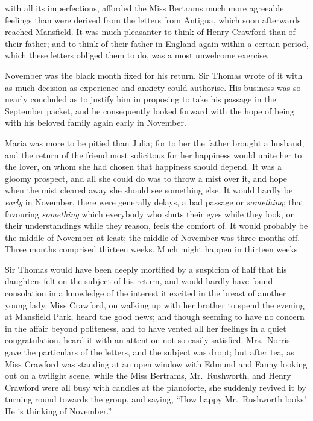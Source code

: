  with all its imperfections,
afforded the Miss Bertrams much more agreeable feelings
than were derived from the letters from Antigua,
which soon afterwards reached Mansfield.  It was much
pleasanter to think of Henry Crawford than of their father;
and to think of their father in England again within
a certain period, which these letters obliged them to do,
was a most unwelcome exercise.

November was the black month fixed for his return.
Sir Thomas wrote of it with as much decision as experience
and anxiety could authorise.  His business was so nearly
concluded as to justify him in proposing to take his
passage in the September packet, and he consequently
looked forward with the hope of being with his beloved
family again early in November.

Maria was more to be pitied than Julia; for to her the
father brought a husband, and the return of the friend most
solicitous for her happiness would unite her to the lover,
on whom she had chosen that happiness should depend.
It was a gloomy prospect, and all she could do was to
throw a mist over it, and hope when the mist cleared
away she should see something else.  It would hardly
be \emph{early} in November, there were generally delays,
a bad passage or \emph{something}; that favouring \emph{something}
which everybody who shuts their eyes while they look,
or their understandings while they reason, feels the
comfort of.  It would probably be the middle of November
at least; the middle of November was three months off.
Three months comprised thirteen weeks.  Much might happen
in thirteen weeks.

Sir Thomas would have been deeply mortified by a suspicion
of half that his daughters felt on the subject of his return,
and would hardly have found consolation in a knowledge of the
interest it excited in the breast of another young lady.
Miss Crawford, on walking up with her brother to spend
the evening at Mansfield Park, heard the good news;
and though seeming to have no concern in the affair
beyond politeness, and to have vented all her feelings
in a quiet congratulation, heard it with an attention
not so easily satisfied.  Mrs.\ Norris gave the particulars
of the letters, and the subject was dropt; but after tea,
as Miss Crawford was standing at an open window with
Edmund and Fanny looking out on a twilight scene,
while the Miss Bertrams, Mr.\ Rushworth, and Henry Crawford
were all busy with candles at the pianoforte, she suddenly
revived it by turning round towards the group, and saying,
``How happy Mr.\ Rushworth looks!  He is thinking of November.''

